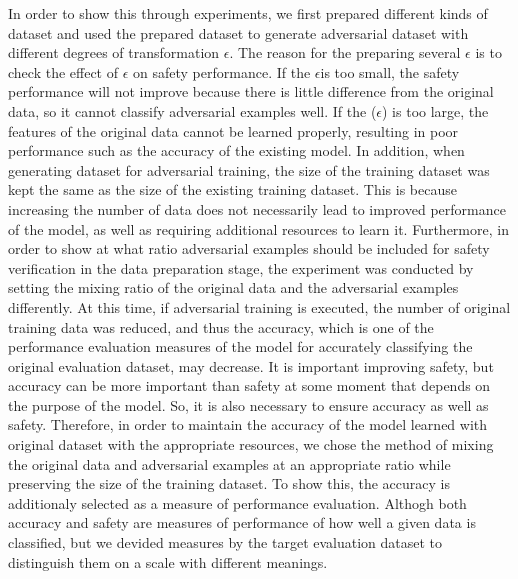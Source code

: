 \documentclass[journal,article,submit,moreauthors,pdftex]{Definitions/mdpi}
\begin{document}
In order to show this through experiments, we first prepared different kinds of dataset and used the prepared dataset to generate adversarial dataset with different degrees of transformation \begin{math}\epsilon\end{math}.
The reason for the preparing several \begin{math}\epsilon\end{math} is to check the effect of \begin{math}\epsilon\end{math} on safety performance. If the \begin{math}\epsilon\end{math}is too small, the safety performance will not improve because there is little difference from the original data, so it cannot classify adversarial examples well. If the (\begin{math}\epsilon\end{math}) is too large, the features of the original data cannot be learned properly, resulting in poor performance such as the accuracy of the existing model.
In addition, when generating dataset for adversarial training, the size of the training dataset was kept the same as the size of the existing training dataset.
This is because increasing the number of data does not necessarily lead to improved performance of the model, as well as requiring additional resources to learn it.
Furthermore, in order to show at what ratio adversarial examples should be included for safety verification in the data preparation stage, the experiment was conducted by setting the mixing ratio of the original data and the adversarial examples differently.
At this time, if adversarial training is executed, the number of original training data was reduced, and thus the accuracy, which is one of the performance evaluation measures of the model for accurately classifying the original evaluation dataset, may decrease\cite{trade-off}. 
It is important improving safety, but accuracy can be more important than safety at some moment that depends on the purpose of the model.
So, it is also necessary to ensure accuracy as well as safety. 
Therefore, in order to maintain the accuracy of the model learned with original dataset with the appropriate resources, we chose the method of mixing the original data and adversarial examples at an appropriate ratio while preserving the size of the training dataset.
To show this, the accuracy is additionaly selected as a measure of performance evaluation.
Althogh both accuracy and safety are measures of performance of how well a given data is classified, but we devided measures by the target evaluation dataset to distinguish them on a scale with different meanings.
\end{document}
